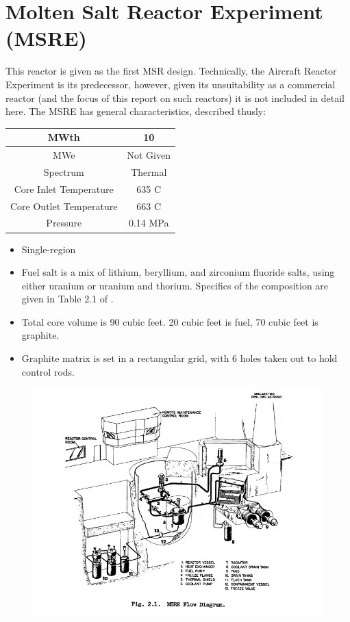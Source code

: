 \documentclass[letterpaper]{article}
\begin{document}
\section{Molten Salt Reactor Experiment (MSRE)}
This reactor is given as the first MSR design.  Technically, the Aircraft Reactor Experiment is its predecessor, however, given its unsuitability as a commercial reactor (and the focus of this report on such reactors) it is not included in detail here.  The MSRE has general characteristics, described thusly: \cite{robertson_msre_1965}

\begin{center}
\begin{tabular}{|c|c|}
\hline
MWth & 10\\
\hline
MWe & Not Given \\
\hline
Spectrum & Thermal \\
\hline
Core Inlet Temperature & 635 C \\
\hline
Core Outlet Temperature & 663 C\\
\hline
Pressure & 0.14 MPa \\
\hline
\end{tabular}
\end{center}

\begin{itemize}
\item Single-region
\item Fuel salt is a mix of lithium, beryllium, and zirconium fluoride salts, using either uranium or uranium and thorium.  Specifics of the composition are given in Table 2.1 of \cite{robertson_msre_1965}.
\item Total core volume is 90 cubic feet.  20 cubic feet is fuel, 70 cubic feet is graphite.
\item Graphite matrix is set in a rectangular grid, with 6 holes taken out to hold control rods.
\end{itemize}

\begin{figure}[H]
  \centering
  \includegraphics[width=1.0\linewidth]{figures/MSREsource1.png}
  \label{fig:fig1}
\end{figure}
\end{document}
